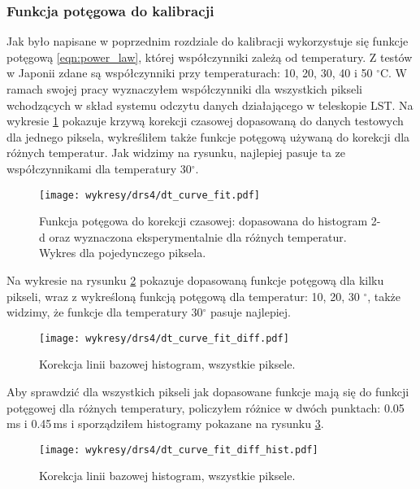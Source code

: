 \documentclass[a4paper,11pt,twoside]{article}
\begin{document}
\subsubsection{Funkcja potęgowa do kalibracji}
Jak było napisane w poprzednim rozdziale do kalibracji wykorzystuje się funkcje potęgową \ref{eqn:power_law}, której współczynniki zależą od temperatury. Z testów w Japonii zdane są współczynniki przy temperaturach: 10, 20, 30, 40 i 50 $^\circ$C. W ramach swojej pracy wyznaczyłem  współczynniki dla wszystkich pikseli wchodzących w skład systemu odczytu danych działającego w teleskopie LST. Na wykresie \ref{fig:dt_curve_fit_all_temp} pokazuje krzywą korekcji czasowej dopasowaną do danych testowych dla jednego piksela, wykreśliłem także funkcje potęgową używaną do korekcji dla różnych temperatur. Jak widzimy na rysunku, najlepiej pasuje ta ze współczynnikami dla temperatury 30$^{\circ}$. 
\begin{figure}[H] 
\centering
\texttt{[image: wykresy/drs4/dt\_curve\_fit.pdf]}
\caption{Funkcja potęgowa do korekcji czasowej: dopasowana do histogram 2-d oraz wyznaczona eksperymentalnie dla różnych temperatur. Wykres dla  pojedynczego piksela.}
\label{fig:dt_curve_fit_all_temp}
\end{figure}
Na wykresie na rysunku \ref{fig:dt_curve_fit_few_pixels} pokazuje dopasowaną funkcje potęgową dla kilku pikseli, wraz z wykreśloną funkcją potęgową dla temperatur: 10, 20, 30 $^{\circ}$, także widzimy, że funkcje dla temperatury 30$^{\circ}$ pasuje najlepiej.
\begin{figure}[H] 
\centering
\texttt{[image: wykresy/drs4/dt\_curve\_fit\_diff.pdf]}
\caption{Korekcja linii bazowej histogram, wszystkie piksele.}
\label{fig:dt_curve_fit_few_pixels}
\end{figure}
Aby sprawdzić dla wszystkich pikseli jak dopasowane funkcje mają się do funkcji potęgowej dla różnych temperatury, policzyłem różnice w dwóch punktach: 0.05\,ms i 0.45\,ms i sporządziłem histogramy pokazane na rysunku \ref{fig:dt_curve_hist}.
\begin{figure}[H] 
\centering
\texttt{[image: wykresy/drs4/dt\_curve\_fit\_diff\_hist.pdf]}
\caption{Korekcja linii bazowej histogram, wszystkie piksele.}
\label{fig:dt_curve_hist}
\end{figure}
\end{document}
